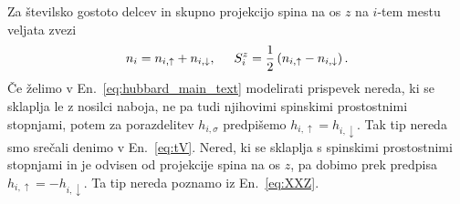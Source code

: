 Za številsko gostoto delcev in skupno projekcijo spina na os $z$ na $i$-tem mestu  veljata zvezi
\begin{equation}\label{eq:hubb_zveze}
n_i=n_{i,\uparrow}+n_{i,\downarrow},\hspace{5mm} S_i^z=\frac{1}{2}\left(n_{i,\uparrow} - n_{i,\downarrow}\right).
\end{equation}
Če želimo v En.~\eqref{eq:hubbard_main_text} modelirati prispevek nereda, ki se sklaplja le z nosilci naboja, ne pa tudi njihovimi spinskimi prostostnimi stopnjami, potem za porazdelitev $h_{i,\sigma}$ predpišemo $h_{i, \uparrow}=h_{i,\downarrow}.$ Tak tip nereda smo srečali denimo v En.~\eqref{eq:tV}. Nered, ki se sklaplja s spinskimi prostostnimi stopnjami in je odvisen od projekcije spina na os $z$, pa dobimo prek predpisa $h_{i,\uparrow}=-h_{i,\downarrow}.$ Ta tip nereda poznamo iz En.~\eqref{eq:XXZ}.
